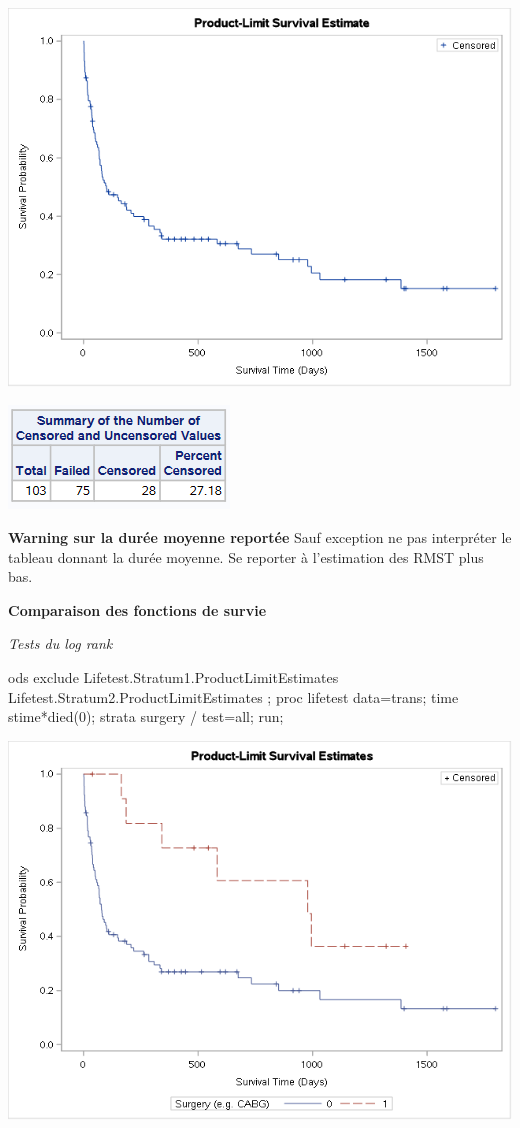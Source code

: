 \documentclass[
  12pt,
  letterpaper,
  DIV=11,
  numbers=noendperiod,
  onepage,
  openany]{scrreprt}
\newenvironment{Shaded}{\begin{snugshade}}{\end{snugshade}}
\newcommand{\DecValTok}[1]{\textcolor[rgb]{0.86,0.86,0.80}{#1}}
\newcommand{\FunctionTok}[1]{\textcolor[rgb]{0.94,0.94,0.56}{#1}}
\newcommand{\NormalTok}[1]{\textcolor[rgb]{0.80,0.80,0.80}{#1}}
\newcommand{\OtherTok}[1]{\textcolor[rgb]{0.94,0.94,0.56}{#1}}
\newcommand{\SpecialCharTok}[1]{\textcolor[rgb]{0.86,0.64,0.64}{#1}}
\begin{document}
\includegraphics{sas/2b.png}

\includegraphics{sas/2c.PNG}

\textbf{Warning sur la durée moyenne reportée} Sauf exception ne pas
interpréter le tableau donnant la durée moyenne. Se reporter à
l'estimation des RMST plus bas.

\textbf{Comparaison des fonctions de survie}

\emph{Tests du log rank}

\begin{Shaded}
\begin{Highlighting}[]
\NormalTok{ods exclude Lifetest.Stratum1.ProductLimitEstimates Lifetest.Stratum2.ProductLimitEstimates ;}
\NormalTok{proc lifetest data}\OtherTok{=}\NormalTok{trans;}
\NormalTok{time stime}\SpecialCharTok{*}\FunctionTok{died}\NormalTok{(}\DecValTok{0}\NormalTok{);}
\NormalTok{strata surgery }\SpecialCharTok{/}\NormalTok{ test}\OtherTok{=}\NormalTok{all;}
\NormalTok{run;}
\end{Highlighting}
\end{Shaded}

\includegraphics{sas/3a.png}
\end{document}
